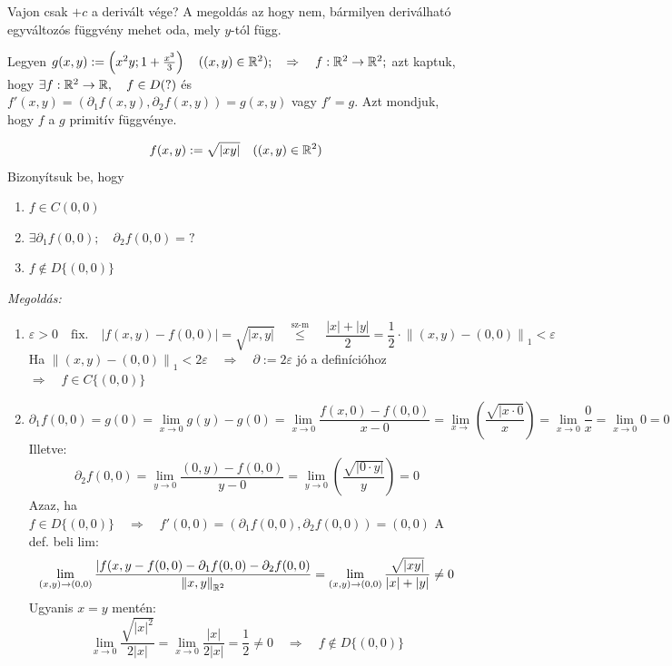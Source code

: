 \documentclass[a4paper,11.5pt]{article}
\newcommand{\norm}[1]{\left\lVert#1\right\rVert}
\begin{document}
	\begin{note}
		Vajon csak $+c$ a derivált vége? A megoldás az hogy nem, bármilyen deriválható egyváltozós függvény mehet oda, mely $y$-tól függ.
	\end{note}
	\begin{note}
		Legyen $g(x,y):=\left(x^2y;1+\frac{x^3}{3}\right)\quad ((x,y)\in\mathbb{R}^2);\quad \Rightarrow\quad f:\mathbb{R}^2\to\mathbb{R}^2;$ azt kaptuk, hogy $\exists f:\mathbb{R}^2\to\mathbb{R},\quad f\in D (?)$ és $f'(x,y)=(\partial_1f(x,y),\partial_2f(x,y))=g(x,y)$ vagy $f'=g$. Azt mondjuk, hogy $f$ a $g$ primitív függvénye.
	\end{note}
	\begin{task}
		\[ f(x,y):=\sqrt{|xy|}\quad ((x,y)\in\mathbb{R}^2) \]
		Bizonyítsuk be, hogy \begin{enumerate}
			\item $f\in C(0,0)$
			\item $\exists\partial_1f(0,0);\quad \partial_2f(0,0)=?$
			\item $f\notin D\{(0,0)\}$
		\end{enumerate}
		\textit{Megoldás:}
		\begin{enumerate}
			\item 
			\[ \varepsilon>0\quad \text{fix.}\quad |f(x,y)-f(0,0)|=\sqrt{|x,y|}\quad \overset{\text{sz-m}}{\leq}\quad \frac{|x|+|y|}{2}=\frac{1}{2}\cdot\norm{(x,y)-(0,0)}_1<\varepsilon \]
			Ha $\norm{(x,y)-(0,0)}_1<2\varepsilon\quad \Rightarrow\quad \partial:=2\varepsilon$ jó a definícióhoz\quad $\Rightarrow\quad f\in C\{(0,0)\}$
			\item \[\partial_1f(0,0)=g(0)=\lim_{x\to0}g(y)-g(0)=\lim_{x\to0}\frac{f(x,0)-f(0,0)}{x-0}=\lim_{x\to}\left(\frac{\sqrt{|x\cdot0}}{x}\right)=\lim_{x\to0}\frac{0}{x}=\lim_{x\to0}0=0 \]
			Illetve:
			\[ \partial_2f(0,0)=\lim_{y\to0}\frac{(0,y)-f(0,0)}{y-0}=\lim_{y\to0}\left(\frac{\sqrt{|0\cdot y|}}{y}\right)=0 \]
			Azaz, ha $f\in D\{(0,0)\}\quad \Rightarrow\quad f'(0,0)=(\partial_1f(0,0), \partial_2f(0,0))=(0,0)$
			A def. beli lim:
			\[ \lim_{(x,y)\to(0,0)}\frac{|f(x,y-f(0,0)-\partial_1f(0,0)-\partial_2f(0,0)}{\norm{x,y}_{\R^2}}=\lim_{(x,y)\to(0,0)}\frac{\sqrt{|xy|}}{|x|+|y|}\not=0 \]
			Ugyanis $x=y$ mentén:
			\[ \lim_{x\to0}\frac{\sqrt{|x|^2}}{2|x|}=\lim_{x\to0}\frac{|x|}{2|x|}=\frac{1}{2}\not=0\quad \Rightarrow\quad f\notin D\{(0,0)\} \]
		\end{enumerate}
	\end{task}
\end{document}
